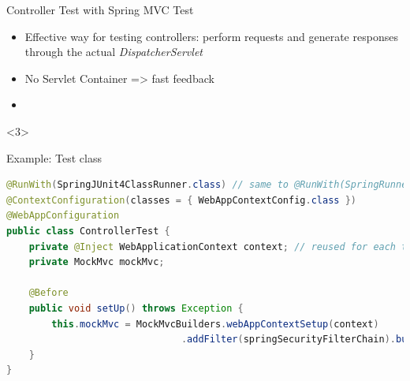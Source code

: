 \begin{frame}[fragile]{Controller Test with Spring MVC Test}
\begin{itemize}
\small
\item Effective way for testing controllers: perform requests and generate responses through the actual \emph{DispatcherServlet}
\item No Servlet Container => fast feedback
\item {}
\end{itemize}
\vfill
{}
\begin{visibleenv}<3>
\begin{block}{Example: Test class}
\begin{lstlisting}[language=Java,belowskip=-3mm,aboveskip=0mm]
@RunWith(SpringJUnit4ClassRunner.class) // same to @RunWith(SpringRunner.class)
@ContextConfiguration(classes = { WebAppContextConfig.class })
@WebAppConfiguration
public class ControllerTest {
    private @Inject WebApplicationContext context; // reused for each test
    private MockMvc mockMvc;
    
    @Before
    public void setUp() throws Exception {
        this.mockMvc = MockMvcBuilders.webAppContextSetup(context)
		                       .addFilter(springSecurityFilterChain).build();
    }
}
\end{lstlisting}
\end{block}
\end{visibleenv}
\end{frame}

